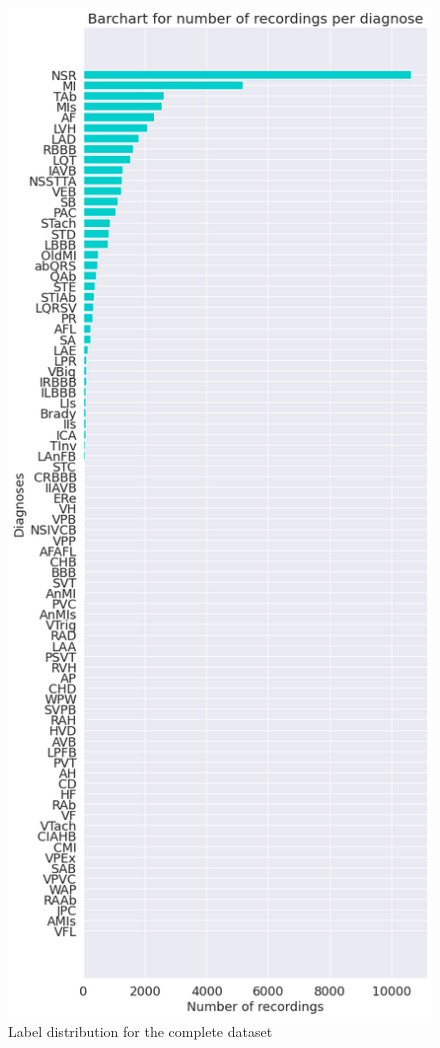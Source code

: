 \begin{figure}[H]
\centering
\includegraphics[scale=0.32]{img/label_ditro_alldata.png}
\caption{Label distribution for the complete dataset}
\label{fig:label_ditro_alldata}
\end{figure}

